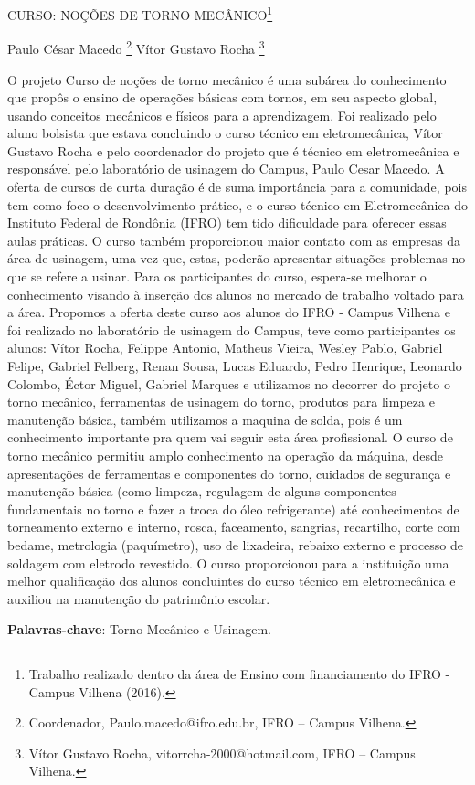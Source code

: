 \documentclass[article,12pt,onesidea,4paper,english,brazil]{abntex2}
\begin{document}
	
	
	\frenchspacing 
	
	\begin{center}
		\LARGE CURSO: NOÇÕES DE TORNO MECÂNICO\footnote{Trabalho realizado dentro da área de Ensino com financiamento do IFRO - Campus Vilhena (2016).}
		
		\normalsize
	Paulo César Macedo \footnote{Coordenador, Paulo.macedo@ifro.edu.br, IFRO – Campus Vilhena.} 
	Vítor Gustavo Rocha \footnote{Vítor Gustavo Rocha, vitorrcha-2000@hotmail.com, IFRO – Campus Vilhena.} 
	\end{center}
	
	\noindent O projeto Curso de noções de torno mecânico é uma subárea do conhecimento que propôs o ensino de operações básicas com tornos, em seu aspecto global, usando conceitos mecânicos e físicos para a aprendizagem. Foi realizado pelo aluno bolsista que estava concluindo o curso técnico em eletromecânica, Vítor Gustavo Rocha e pelo coordenador do projeto que é técnico em eletromecânica e responsável pelo laboratório de usinagem do Campus, Paulo Cesar Macedo. A oferta de cursos de curta duração é de suma importância para a comunidade, pois tem como foco o desenvolvimento prático, e o curso técnico em Eletromecânica do Instituto Federal de Rondônia (IFRO) tem tido dificuldade para oferecer essas aulas práticas. O curso também proporcionou maior contato com as empresas da área de usinagem, uma vez que, estas, poderão apresentar situações problemas no que se refere a usinar. Para os participantes do curso, espera-se melhorar o conhecimento visando à inserção dos alunos no mercado de trabalho voltado para a área. Propomos a oferta deste curso aos alunos do IFRO - Campus Vilhena e foi realizado no laboratório de usinagem do Campus, teve como participantes os alunos: Vítor Rocha, Felippe Antonio, Matheus Vieira, Wesley Pablo, Gabriel Felipe, Gabriel Felberg, Renan Sousa, Lucas Eduardo, Pedro Henrique, Leonardo Colombo, Éctor Miguel, Gabriel Marques e utilizamos no decorrer do projeto o torno mecânico, ferramentas de usinagem do torno, produtos para limpeza e manutenção básica, também utilizamos a maquina de solda, pois é um conhecimento importante pra quem vai seguir esta área profissional. O curso de torno mecânico permitiu amplo conhecimento na operação da máquina, desde apresentações de ferramentas e componentes do torno, cuidados de segurança e manutenção básica (como limpeza, regulagem de alguns componentes fundamentais no torno e fazer a troca do óleo refrigerante) até conhecimentos de torneamento externo e interno, rosca, faceamento, sangrias, recartilho, corte com bedame, metrologia (paquímetro), uso de lixadeira, rebaixo externo e processo de soldagem com eletrodo revestido. O curso proporcionou para a instituição uma melhor qualificação dos alunos concluintes do curso técnico em eletromecânica e auxiliou na manutenção do patrimônio escolar. 
	
	\vspace{\onelineskip}
	
	\noindent
	\textbf{Palavras-chave}: Torno Mecânico e Usinagem.
	
\end{document}
